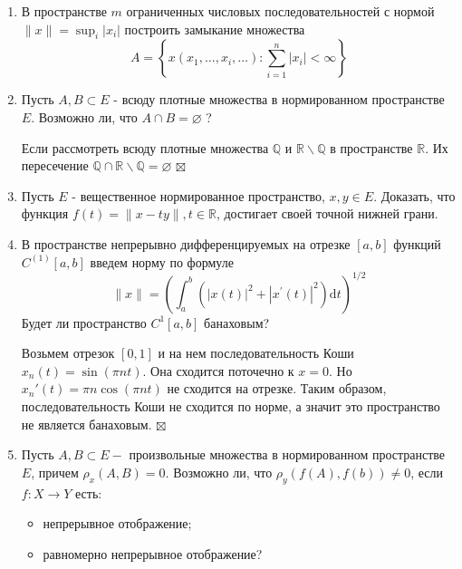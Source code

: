 \documentclass[a4paper, 12pt]{report}
\newenvironment{Proof} %
{\par\noindent{$\blacklozenge$}} %
{\hfill$\scriptstyle\boxtimes$}
\newcommand{\Rm}{\mathbb{R}}
\renewcommand{\leq}{\leqslant}
\newcommand\Norm[1]{\left\| #1 \right\|}
\begin{document}
\begin{enumerate}
\begin{Proof}
\begin{enumerate}
				\item $\Norm{(x_1, x_2) + (y_1,y_2)} = \Norm{(x_1+y_1, x_2 + y_2)} = \Norm{x_1+y_1}_1 + \Norm{x_2 + y_2}_2 \leq \Norm{x_1}_1 + \Norm{y_1}_1 + \Norm{x_2}_2 + \Norm{y_2}_2 = \Norm{(x_1, x_2)} + \Norm{(y_1,y_2)}$
			\end{enumerate}
		\end{Proof}
		\item В пространстве $m$ ограниченных числовых последовательностей с нормой $\|x\|=\sup _{i}\left|x_{i}\right|$ построить замыкание множества
		$$
		A=\left\{x\left(x_{1}, \ldots, x_{i}, \ldots\right): \sum_{i=1}^{n}\left|x_{i}\right|<\infty\right\}
		$$
		\item Пусть $A, B \subset E$ - всюду плотные множества в нормированном пространстве $E$. Возможно ли, что $A \cap B=\varnothing$ ?
		\begin{Proof}
			Если рассмотреть всюду плотные множества $\mathbb{Q}$ и $\Rm\backslash \mathbb{Q}$ в пространстве $\Rm$. Их пересечение $\mathbb{Q}\cap \Rm\backslash \mathbb{Q} = \varnothing$
		\end{Proof}
		\item Пусть $E$ - вещественное нормированное пространство, $x, y \in E$. Доказать, что функция $f(t)=\|x-t y\|, t \in \mathbb{R}$, достигает своей точной нижней грани.
		\item В пространстве непрерывно дифференцируемых на отрезке $[a, b]$ функций $C^{(1)}[a, b]$ введем норму по формуле
		$$
		\|x\|=\left(\int_{a}^{b}\left(|x(t)|^{2}+\left|x^{\prime}(t)\right|^{2}\right) \mathrm{d} t\right)^{1 / 2}
		$$
		Будет ли пространство $C^{1}[a, b]$ банаховым?
		\begin{Proof}
			Возьмем отрезок $[0,1]$ и на нем последовательность Коши $x_n(t) = \sin(\pi n t)$. Она сходится поточечно к $x = 0$. Но $x_n'(t) = \pi n \cos (\pi n t)$ не сходится на отрезке. Таким образом, последовательность Коши не сходится по норме, а значит это пространство не является банаховым.
		\end{Proof}
		\item Пусть $A, B \subset E-$ произвольные множества в нормированном пространстве $E$, причем $\rho_{x}(A, B)=0$. Возможно ли, что $\rho_{y}(f(A), f(b)) \neq 0$, если $f: X \rightarrow Y$ есть:
		\begin{itemize}
		\item непрерывное отображение;
		
		\item равномерно непрерывное отображение?
		

\end{itemize}
\end{enumerate}
\end{document}
